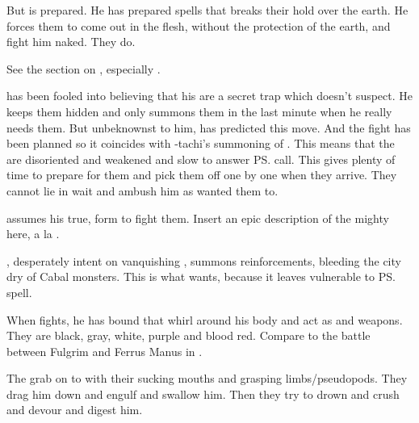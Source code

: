 But \Ishnaruchaefir is prepared. 
He has prepared spells that breaks their hold over the earth. 
He forces them to come out in the flesh, without the protection of the earth, and fight him naked. 
They do. 

See the section on , especially .

\Teshrial{} has been fooled into believing that his \noggyaleth{} are a secret trap which \Ishnaruchaefir{} doesn't suspect. 
He keeps them hidden and only summons them in the last minute when he really needs them. 
But unbeknownst to him, \Ishnaruchaefir{} has predicted this move. 
And the fight has been planned so it coincides with \Psyrex-tachi's summoning of \Nithdornazsh. 
This means that the \noggyaleth{} are disoriented and weakened and slow to answer \ps{\Teshrial} call. 
This gives \Ishnaruchaefir{} plenty of time to prepare for them and pick them off one by one when they arrive. 
They cannot lie in wait and ambush him as \Teshrial{} wanted them to. 

\Ishnaruchaefir{} assumes his true, \draconian{} form to fight them. 
Insert an epic description of the mighty \dragon{} here, a la . 

\Teshrial{}, desperately intent on vanquishing \Ishnaruchaefir{}, summons reinforcements, bleeding the city dry of Cabal monsters. 
This is what \Ishnaruchaefir{} wants, because it leaves \Malcur vulnerable to \ps{\Psyrex}{} spell. 

When \Ishnaruchaefir{} fights, he has bound \daemons{} that whirl around his body and act as \armour and weapons. 
They are black, gray, white, purple and blood red. 
Compare to the battle between Fulgrim and Ferrus Manus in . 

The \noggyaleth grab on to \Ishnaruchaefir with their sucking mouths and grasping limbs/pseudopods.
They drag him down and engulf and swallow him.
Then they try to drown and crush and devour and digest him.

